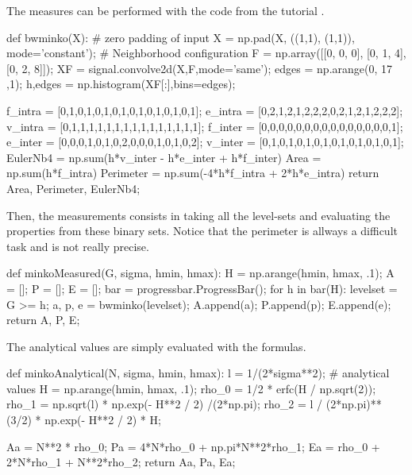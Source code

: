 The measures can be performed with the code from the tutorial .

\begin{python}
def bwminko(X):
    # zero padding of input
    X = np.pad(X, ((1,1), (1,1)), mode='constant');
    # Neighborhood configuration
    F = np.array([[0, 0, 0], [0, 1, 4], [0, 2, 8]]);
    XF = signal.convolve2d(X,F,mode='same');
    edges = np.arange(0, 17 ,1);
    h,edges = np.histogram(XF[:],bins=edges);
    
    f_intra = [0,1,0,1,0,1,0,1,0,1,0,1,0,1,0,1];
    e_intra = [0,2,1,2,1,2,2,2,0,2,1,2,1,2,2,2];
    v_intra = [0,1,1,1,1,1,1,1,1,1,1,1,1,1,1,1];
    f_inter = [0,0,0,0,0,0,0,0,0,0,0,0,0,0,0,1];
    e_inter = [0,0,0,1,0,1,0,2,0,0,0,1,0,1,0,2];
    v_inter = [0,1,0,1,0,1,0,1,0,1,0,1,0,1,0,1];
    EulerNb4 = np.sum(h*v_inter - h*e_inter + h*f_inter)
    Area = np.sum(h*f_intra)
    Perimeter = np.sum(-4*h*f_intra + 2*h*e_intra)
    return Area, Perimeter, EulerNb4;
\end{python}

Then, the measurements consists in taking all the level-sets and evaluating the properties from these binary sets. Notice that the perimeter is allways a difficult task and is not really precise.

\begin{python}
def minkoMeasured(G, sigma, hmin, hmax):
    H = np.arange(hmin, hmax, .1);
    A = [];
    P = [];
    E = [];
    bar = progressbar.ProgressBar();
    for h in bar(H):
        levelset = G >= h;
        a, p, e = bwminko(levelset); 
        A.append(a);
        P.append(p);
        E.append(e);
    return A, P, E;
\end{python}

The analytical values are simply evaluated with the formulas.
\begin{python}
def minkoAnalytical(N, sigma, hmin, hmax):
    l = 1/(2*sigma**2);
    # analytical values
    H = np.arange(hmin, hmax, .1);
    rho_0 = 1/2 * erfc(H / np.sqrt(2));
    rho_1 = np.sqrt(l) * np.exp(- H**2 / 2) /(2*np.pi);
    rho_2 = l / (2*np.pi)**(3/2) * np.exp(- H**2 / 2) * H;
    
    Aa = N**2 * rho_0;
    Pa = 4*N*rho_0 + np.pi*N**2*rho_1;
    Ea = rho_0 + 2*N*rho_1 + N**2*rho_2;
    return Aa, Pa, Ea;
\end{python}
